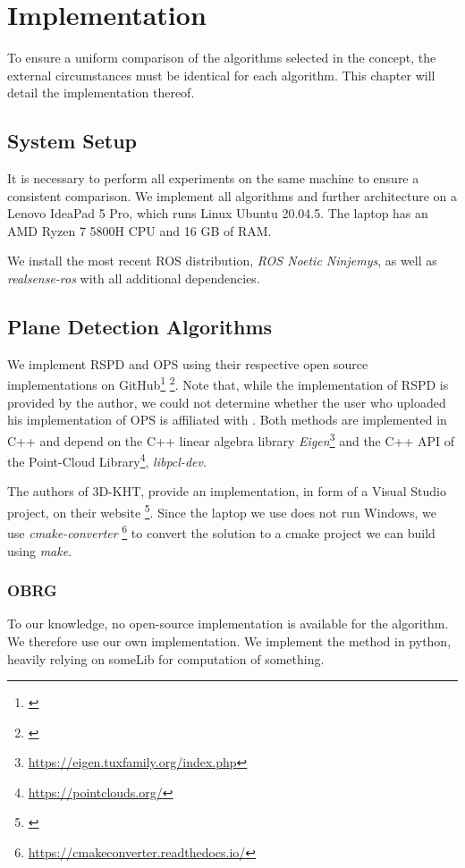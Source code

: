 \documentclass[main.tex]{subfiles}
\begin{document}
\chapter{Implementation}
To ensure a uniform comparison of the algorithms selected in the concept, the external circumstances
must be identical for each algorithm. This chapter will detail the implementation thereof.

\section{System Setup}
It is necessary to perform all experiments on the same machine to ensure a consistent comparison.
We implement all algorithms and further architecture on a Lenovo IdeaPad 5 Pro,
which runs Linux Ubuntu 20.04.5. The laptop has an AMD Ryzen 7 5800H CPU and 16 GB of RAM.

We install the most recent ROS distribution, \textit{ROS Noetic Ninjemys}, as well as \textit{realsense-ros} with all additional dependencies.


\section{Plane Detection Algorithms}
We implement RSPD and OPS using their respective open source implementations on GitHub\footnote{\href{https://github.com/abnerrjo/PlaneDetection}{}}
\footnote{\href{https://github.com/victor-amblard/OrientedPointSampling}{}}. Note that, while the implementation of RSPD is provided by the author,
we could not determine whether the user who uploaded his implementation of OPS is affiliated with \citeauthor{Sun_Mordohai_2019}.
Both methods are implemented in C++ and depend on the C++ linear algebra library \textit{Eigen}\footnote{\href{https://eigen.tuxfamily.org/index.php}{https://eigen.tuxfamily.org/index.php}} 
and the C++ API of the  Point-Cloud Library\footnote{\href{https://pointclouds.org/}{https://pointclouds.org/}}, \textit{libpcl-dev}.

The authors of 3D-KHT, provide an implementation, in form of a Visual Studio project, on their website \footnote{\href{https://www.inf.ufrgs.br/~oliveira/pubs_files/HT3D/HT3D_page.html}
    {}}. Since the laptop we use does not run Windows, we use \textit{cmake-converter}
\footnote{\href{https://cmakeconverter.readthedocs.io/en/latest/use.html}{https://cmakeconverter.readthedocs.io/}} to convert
the solution to a cmake project we can build using \textit{make}.

\subsection*{OBRG}
To our knowledge, no open-source implementation is available for the algorithm.
We therefore use our own implementation.
We implement the method in python, heavily relying on someLib for computation of something.
\end{document}

